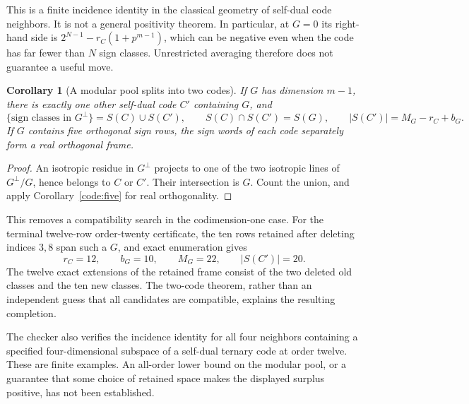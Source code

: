 \documentclass[11pt]{article}
\newtheorem{corollary}[theorem]{Corollary}
\begin{document}
This is a finite incidence identity in the classical geometry of
self-dual code neighbors. It is not a general positivity theorem.
In particular, at $G=0$ its right-hand side is
$2^{N-1}-r_C(1+p^{m-1})$, which can be negative even when the
code has far fewer than $N$ sign classes. Unrestricted averaging
therefore does not guarantee a useful move.

\begin{corollary}[A modular pool splits into two codes]
\label{code:two-codes}
If $G$ has dimension $m-1$, there is exactly one other self-dual
code $C'$ containing $G$, and
\[
 \{ \text{sign classes in }G^\perp\}=S(C)\cup S(C'),\qquad
 S(C)\cap S(C')=S(G),\qquad
 |S(C')|=M_G-r_C+b_G.
\]
If $G$ contains five orthogonal sign rows, the sign words of each
code separately form a real orthogonal frame.
\end{corollary}
\begin{proof}
An isotropic residue in $G^\perp$ projects to one of the two
isotropic lines of $G^\perp/G$, hence belongs to $C$ or $C'$.
Their intersection is $G$. Count the union, and apply
Corollary~\ref{code:five} for real orthogonality.
\end{proof}

This removes a compatibility search in the codimension-one case.
For the terminal twelve-row order-twenty certificate, the ten rows
retained after deleting indices $3,8$ span such a $G$, and exact
enumeration gives
\[
 r_C=12,\qquad b_G=10,\qquad M_G=22,\qquad |S(C')|=20.
\]
The twelve exact extensions of the retained frame consist of the two
deleted old classes and the ten new classes. The two-code theorem,
rather than an independent guess that all candidates are compatible,
explains the resulting completion.

The checker also verifies the incidence identity for all four
neighbors containing a specified four-dimensional subspace of a
self-dual ternary code at order twelve. These are finite examples.
An all-order lower bound on the modular pool, or a guarantee that
some choice of retained space makes the displayed surplus positive,
has not been established.
\end{document}
